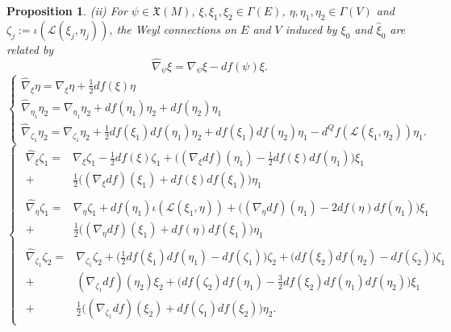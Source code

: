 \documentclass[11pt]{amsart}
\newtheorem{proposition}{Proposition}
\numberwithin{proposition}{section}
\numberwithin{equation}{section}
\begin{document}
\begin{proposition}
(ii) For $\psi\in\mathfrak X(M)$, $\xi,\xi_1,\xi_2\in\Gamma(E)$, $\eta,\eta_1,\eta_2\in\Gamma(V)$ and $\zeta_j:=\iota(\mathcal L(\xi_j,\eta_j))$, the Weyl connections on $E$ and $V$ induced by $\xi_0$ and $\hat\xi_0$ are related by  
\begin{equation}\label{eq:ne-trans}
    \hat\nabla_\psi \xi=\nabla_\psi \xi-df(\psi)\xi. 
\end{equation}
\begin{equation}\label{eq:nv-trans}
    \begin{cases}
      \hat\nabla_\xi\eta=\nabla_\xi\eta+\tfrac12 df(\xi)\eta \\
      \hat\nabla_{\eta_1}\eta_2=\nabla_{\eta_1}\eta_2+df(\eta_1)\eta_2+df(\eta_2)\eta_1 \\
      \hat\nabla_{\zeta_1}\eta_2=\nabla_{\zeta_1}\eta_2+\tfrac12 df(\xi_1)df(\eta_1)\eta_2+df(\xi_1)df(\eta_2)\eta_1-d^Qf(\mathcal L(\xi_1,\eta_2))\eta_1. 
    \end{cases}
\end{equation}
\begin{equation}\label{eq:nq-trans}
    \begin{cases}
        \begin{aligned}
            \hat\nabla_\xi\zeta_1=&\nabla_\xi\zeta_1-\tfrac12df(\xi)\zeta_1+\big((\nabla_\xi df)(\eta_1)-\tfrac12df(\xi)df(\eta_1)\big)\xi_1\\+&\tfrac12\big((\nabla_\xi df)(\xi_1)+df(\xi)df(\xi_1)\big)\eta_1
        \end{aligned}\\
        \begin{aligned}
            \hat\nabla_\eta\zeta_1=&\nabla_\eta\zeta_1+df(\eta_1)\iota(\mathcal{L}(\xi_1,\eta))+\big((\nabla_\eta df)(\eta_1)-2df(\eta)df(\eta_1)\big)\xi_1\\+&\tfrac12\big((\nabla_\eta df)(\xi_1)+df(\eta)df(\xi_1)\big)\eta_1
        \end{aligned}\\
        \begin{aligned}
            \hat\nabla_{\zeta_1}\zeta_2=&\nabla_{\zeta_1}\zeta_2+\big(\tfrac12df(\xi_1)df(\eta_1)-df(\zeta_1)\big)\zeta_2+\big(df(\xi_2)df(\eta_2)-df(\zeta_2)\big)\zeta_1\\ 
            +&(\nabla_{\zeta_1}df)(\eta_2)\xi_2+\big(df(\zeta_2)df(\eta_1)-\tfrac32df(\xi_2)df(\eta_1)df(\eta_2)\big)\xi_1\\
            +&\tfrac12\big((\nabla_{\zeta_1} df)(\xi_2)+df(\zeta_1)df(\xi_2)\big)\eta_2.
        \end{aligned}
    \end{cases}
\end{equation}
\end{proposition}
\end{document}
